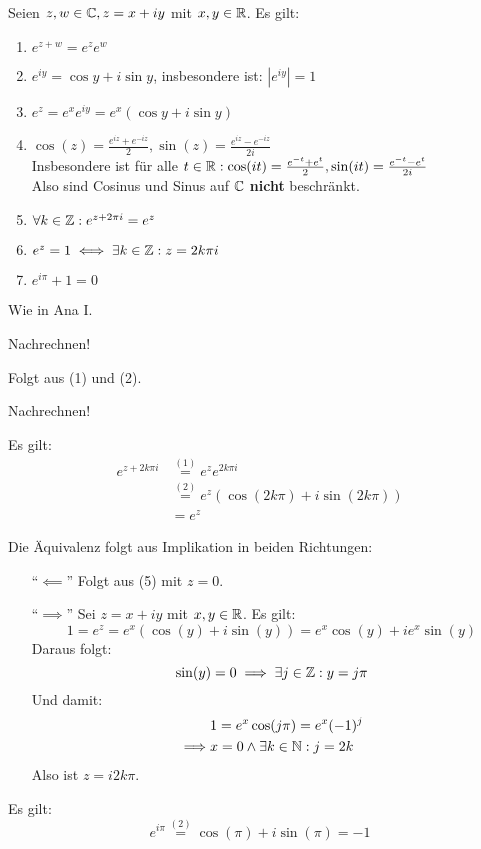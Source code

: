 \documentclass[a4paper,twoside,DIV15,BCOR12mm,chapterprefix=true,headings=twolinechapter]{scrbook}
\begin{document}
\begin{satz}
Seien $z,w\in\mathbb{C}, z=x+iy$ mit $x,y\in\mathbb{R}$. Es gilt:
\begin{enumerate}
\item $e^{z+w}=e^z e^w$
\item $e^{iy}=\cos y+i\sin y$, insbesondere ist: $|e^{iy}|=1$
\item $e^z=e^x e^{iy}=e^x(\cos y+i\sin y)$
\item $ \cos (z)=\frac{e^{iz}+e^{-iz}}{2}, \sin (z)=\frac{e^{iz}-e^{-iz}}{2i}$\\
Insbesondere ist für alle $t\in\mathbb{R}: \cos(it)=\frac{e^{-t}+e^t}{2}, 
\sin(it)=\frac{e^{-t}-e^t}{2i}$\\
Also sind Cosinus und Sinus auf $\mathbb{C}$ \textbf{nicht} beschränkt.
\item $\forall k\in\mathbb{Z}:e^{z+2\pi i}=e^z$
\item $e^z=1 \iff \exists k\in\mathbb{Z}:z=2k\pi i$
\item $e^{i\pi}+1=0$
\end{enumerate}
\end{satz}

\begin{beweise}
\item Wie in Ana I.
\item Nachrechnen!
\item Folgt aus (1) und (2).
\item Nachrechnen!
\item Es gilt:
\begin{align*}
e^{z+2k\pi i} &\stackrel{(1)}{=}e^ze^{2k\pi i}\\
&\stackrel{(2)}{=}e^z(\cos(2k\pi)+i\sin(2k\pi))\\
&= e^z
\end{align*}
\item
Die Äquivalenz folgt aus Implikation in beiden Richtungen:
\begin{enumerate}
\item["`$\impliedby$"'] Folgt aus (5) mit $z=0$.
\item["`$\implies$"'] Sei $z=x+iy$ mit $x,y\in\mathbb{R}$. Es gilt:
\[1=e^z=e^x(\cos(y)+i\sin(y))=e^x\cos(y)+ie^x\sin(y)\]
Daraus folgt:
\[\sin(y)=0\implies \exists j\in\mathbb{Z}:y=j\pi\]
Und damit:
\begin{align*}
&1=e^x\cos(j\pi)=e^x(-1)^j\\
\implies &x=0\wedge\exists k\in\mathbb{N}: j=2k
\end{align*}
Also ist $z=i2k\pi$.
\end{enumerate}
\item Es gilt:
\[e^{i\pi}\stackrel{(2)}{=}\cos(\pi)+i\sin(\pi)=-1\]
\end{beweise}
\end{document}
